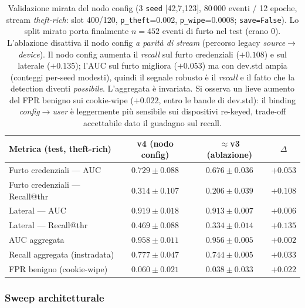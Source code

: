 \documentclass[11pt,a4paper]{report}
\begin{document}
\begin{table}[ht!]
\centering
\renewcommand{\arraystretch}{1.4}
\begin{tabular}{l c c c}
\hline
\textbf{Metrica (test, theft-rich)} & \textbf{v4 (nodo config)} & \textbf{$\approx$v3 (ablazione)} & $\Delta$ \\
\hline
Furto credenziali --- AUC        & $0.729\pm0.088$ & $0.676\pm0.036$ & $+0.053$ \\
Furto credenziali --- Recall@thr & $\mathbf{0.314}\pm0.107$ & $0.206\pm0.039$ & $+0.108$ \\
\hline
Lateral --- AUC                  & $0.919\pm0.018$ & $0.913\pm0.007$ & $+0.006$ \\
Lateral --- Recall@thr           & $\mathbf{0.469}\pm0.088$ & $0.334\pm0.014$ & $+0.135$ \\
\hline
AUC aggregata                    & $0.958\pm0.011$ & $0.956\pm0.005$ & $+0.002$ \\
Recall aggregata (instradata)    & $0.777\pm0.047$ & $0.744\pm0.005$ & $+0.033$ \\
FPR benigno (cookie-wipe)        & $0.060\pm0.021$ & $0.038\pm0.033$ & $+0.022$ \\
\hline
\end{tabular}
\caption{Validazione mirata del nodo config (3 \texttt{seed} [42,7,123], 80\,000 eventi / 12 epoche, stream \emph{theft-rich}: slot 400/120, \texttt{p\_theft}=0.002, \texttt{p\_wipe}=0.0008; \texttt{save=False}). Lo split mirato porta finalmente $n=452$ eventi di furto nel test (erano $0$). L'ablazione disattiva il nodo config \emph{a parità di stream} (percorso legacy \textit{source}$\rightarrow$\textit{device}). Il nodo config aumenta il \textit{recall} sul furto credenziali ($+0.108$) e sul laterale ($+0.135$); l'AUC sul furto migliora ($+0.053$) ma con dev.std ampia (conteggi per-seed modesti), quindi il segnale robusto è il \textit{recall} e il fatto che la detection diventi \emph{possibile}. L'aggregata è invariata. Si osserva un lieve aumento del FPR benigno sui cookie-wipe ($+0.022$, entro le bande di dev.std): il binding \textit{config}$\rightarrow$\textit{user} è leggermente più sensibile sui dispositivi re-keyed, trade-off accettabile dato il guadagno sul recall.}
\label{tab:theft}
\end{table}

\subsubsection{Sweep architetturale}
\label{sec:archsweep}
\end{document}
